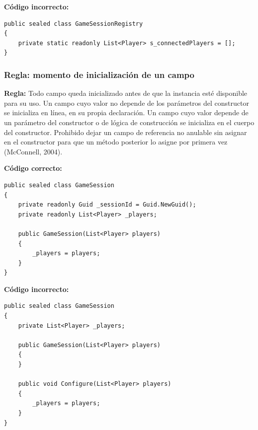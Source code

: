 \textbf{Código incorrecto:}
\begin{lstlisting}[style=csharpstyle]
public sealed class GameSessionRegistry
{
    private static readonly List<Player> s_connectedPlayers = [];
}
\end{lstlisting}

\subsubsection{Regla: momento de inicialización de un campo}

\textbf{Regla:} Todo campo queda inicializado antes de que la instancia esté disponible para su uso. Un campo cuyo valor no depende de los parámetros del constructor se inicializa en línea, en su propia declaración. Un campo cuyo valor depende de un parámetro del constructor o de lógica de construcción se inicializa en el cuerpo del constructor. Prohibido dejar un campo de referencia no anulable sin asignar en el constructor para que un método posterior lo asigne por primera vez (McConnell, 2004).

\textbf{Código correcto:}
\begin{lstlisting}[style=csharpstyle]
public sealed class GameSession
{
    private readonly Guid _sessionId = Guid.NewGuid();
    private readonly List<Player> _players;

    public GameSession(List<Player> players)
    {
        _players = players;
    }
}
\end{lstlisting}

\textbf{Código incorrecto:}
\begin{lstlisting}[style=csharpstyle]
public sealed class GameSession
{
    private List<Player> _players;

    public GameSession(List<Player> players)
    {
    }

    public void Configure(List<Player> players)
    {
        _players = players;
    }
}
\end{lstlisting}
